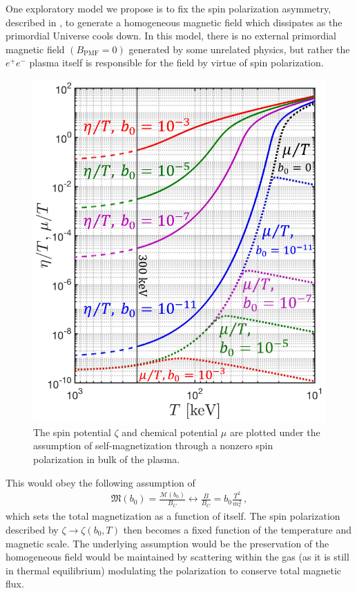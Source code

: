 \label{sec:self}
\noindent One exploratory model we propose is to fix the spin polarization asymmetry, described in , to generate a homogeneous magnetic field which dissipates as the primordial Universe cools down. In this model, there is no external primordial magnetic field $({B}_\mathrm{PMF}=0)$ generated by some unrelated physics, but rather the $e^{+}e^{-}$ plasma itself is responsible for the field by virtue of spin polarization.

\begin{figure}[ht]
 \centering
 \includegraphics[width=0.9\linewidth]{plots/Spinchemical_03.png}
 \caption{The spin potential $\zeta$ and chemical potential $\mu$ are plotted under the assumption of self-magnetization through a nonzero spin polarization in bulk of the plasma. }
 \label{fig:self} 
\end{figure}

This would obey the following assumption of
\begin{align}
 \label{selfmag}
 {\mathfrak M}(b_{0})=\frac{\mathcal{M}(b_0)}{{B}_{C}}\longleftrightarrow\frac{B}{{B}_{C}}=b_{0}\frac{T^{2}}{m_{e}^{2}}\,,
\end{align}
which sets the total magnetization as a function of itself. The spin polarization described by $\zeta\rightarrow\zeta(b_{0},T)$ then becomes a fixed function of the temperature and magnetic scale. The underlying assumption would be the preservation of the homogeneous field would be maintained by scattering within the gas (as it is still in thermal equilibrium) modulating the polarization to conserve total magnetic flux.

